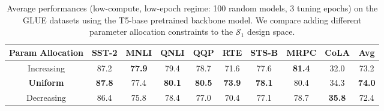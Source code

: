 \begin{table}[t]
\caption{Average performances (low-compute, low-epoch regime: 100 random models, 3 tuning epochs) on the GLUE datasets using the T5-base pretrained backbone model. We compare adding different parameter allocation constraints to the $\mathcal{S}_1$ design space.} \label{Tab:Allocate}
\begin{center}
\small
\begin{tabular}{c|cccccccc|c}
\toprule
\textbf{Param Allocation} & \textbf{SST-2}                          & \textbf{MNLI}                           & \textbf{QNLI}       & \textbf{QQP}        & \textbf{RTE}        & \textbf{STS-B}      & \textbf{MRPC}       & \textbf{CoLA} & \textbf{Avg}        \\ \midrule \midrule
Increasing   & 87.2                           & \textbf{ 77.9 }                     & 79.4 & 78.7        & 71.6   & 77.6         & \textbf{ 81.4 } & 32.0  &73.2 \\
\textbf{Uniform}        & \textbf{87.8} & 77.4  & \textbf{ 80.1 } & \textbf{ 80.5 } & \textbf{ 73.9 } & \textbf{78.1} & 80.4  & 34.3  & \textbf{74.0}      \\
Decreasing       & 86.4                           & 75.8                             & 78.4          & 77.0           & 70.4           & 77.1         & 78.7       & \textbf{ 35.8 } &72.4 \\ \bottomrule
\end{tabular} 
\end{center}
\end{table}